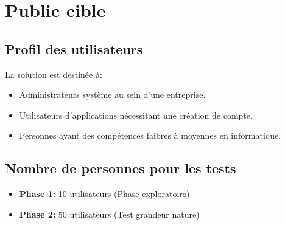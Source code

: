 \section{Public cible}
\subsection{Profil des utilisateurs}
La solution est destinée à:
\begin{itemize}
    \item Administrateurs système au sein d'une entreprise.
    \item Utilisateurs d'applications nécessitant une création de compte.
    \item Personnes ayant des compétences faibres à moyennes en informatique.
\end{itemize}
\subsection{Nombre de personnes pour les tests}
\begin{itemize}
    \item \textbf{Phase 1:} 10 utilisateurs (Phase exploratoire)
    \item \textbf{Phase 2:} 50 utilisateurs (Test grandeur nature)
\end{itemize}